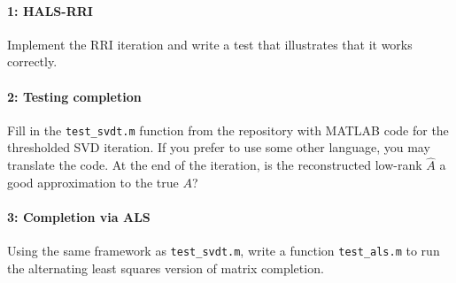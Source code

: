 \documentclass[12pt, leqno]{article} %
\begin{document}

\paragraph*{1: HALS-RRI}
Implement the RRI iteration and write a test that illustrates
that it works correctly.

\paragraph*{2: Testing completion}
Fill in the {\tt test\_svdt.m} function from the repository with
MATLAB code for the thresholded SVD iteration.  If you prefer to
use some other language, you may translate the code.  At the end of the
iteration, is the reconstructed low-rank $\hat{A}$ a good
approximation to the true $A$?

\paragraph*{3: Completion via ALS}
Using the same framework as {\tt test\_svdt.m}, write a function
{\tt test\_als.m} to run the alternating least squares version
of matrix completion.
\end{document}
